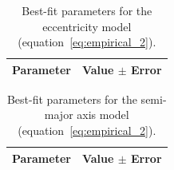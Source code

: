 \documentclass[journal]{IEEEtran}
\begin{document}
\begin{table}[!ht]
    \centering
    \caption{Best-fit parameters for the eccentricity model (equation~\eqref{eq:empirical_2}).}
    \label{tab:fit_e}
    \begin{tabular}{ll}
        \toprule
        Parameter & Value $\pm$ Error \\
        \midrule
        
    \end{tabular}
\end{table}

\begin{table}[!ht]
    \centering
    \caption{Best-fit parameters for the semi-major axis model (equation~\eqref{eq:empirical_2}).}
    \label{tab:fit_a}
    \begin{tabular}{ll}
        \toprule
        Parameter & Value $\pm$ Error \\
        \midrule
        
    \end{tabular}
\end{table}




\end{document}

